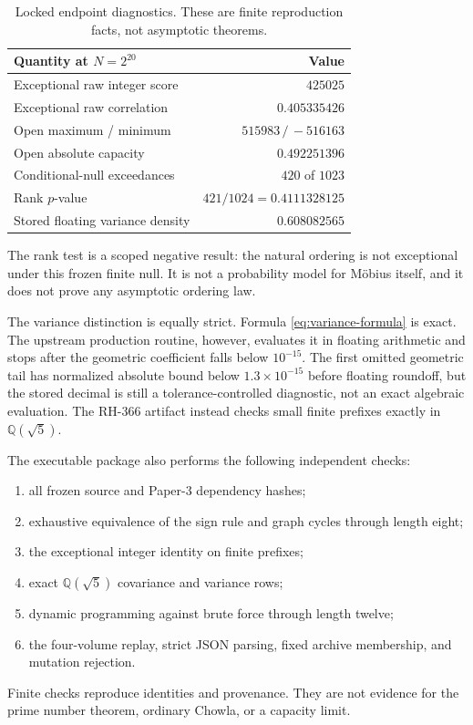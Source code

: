 \documentclass[11pt,a4paper]{article}
\theoremstyle{remark}
\begin{document}
\begin{table}[ht]
\centering
\small
\caption{Locked endpoint diagnostics.  These are finite reproduction facts,
not asymptotic theorems.}
\label{tab:finite}
\begin{tabular}{@{}lr@{}}
\toprule
Quantity at $N=2^{20}$ & Value\\
\midrule
Exceptional raw integer score & $425025$\\
Exceptional raw correlation & $0.405335426$\\
Open maximum / minimum & $515983\,/\,-516163$\\
Open absolute capacity & $0.492251396$\\
Conditional-null exceedances & $420$ of $1023$\\
Rank $p$-value & $421/1024=0.4111328125$\\
Stored floating variance density & $0.608082565$\\
\bottomrule
\end{tabular}
\end{table}

The rank test is a scoped negative result: the natural ordering is not
exceptional under this frozen finite null.  It is not a probability model for
M\"obius itself, and it does not prove any asymptotic ordering law.

The variance distinction is equally strict.  Formula
\eqref{eq:variance-formula} is exact.  The upstream production routine,
however, evaluates it in floating arithmetic and stops after the geometric
coefficient falls below $10^{-15}$.  The first omitted geometric tail has
normalized absolute bound below $1.3\times10^{-15}$ before floating roundoff,
but the stored decimal is still a tolerance-controlled diagnostic, not an
exact algebraic evaluation.  The RH-366 artifact instead checks small finite
prefixes exactly in $\mathbb Q(\sqrt5)$.

The executable package also performs the following independent checks:
\begin{enumerate}[leftmargin=2em]
 \item all frozen source and Paper-3 dependency hashes;
 \item exhaustive equivalence of the sign rule and graph cycles through
       length eight;
 \item the exceptional integer identity on finite prefixes;
 \item exact $\mathbb Q(\sqrt5)$ covariance and variance rows;
 \item dynamic programming against brute force through length twelve;
 \item the four-volume replay, strict JSON parsing, fixed archive membership,
       and mutation rejection.
\end{enumerate}
Finite checks reproduce identities and provenance.  They are not evidence for
the prime number theorem, ordinary Chowla, or a capacity limit.
\end{document}
